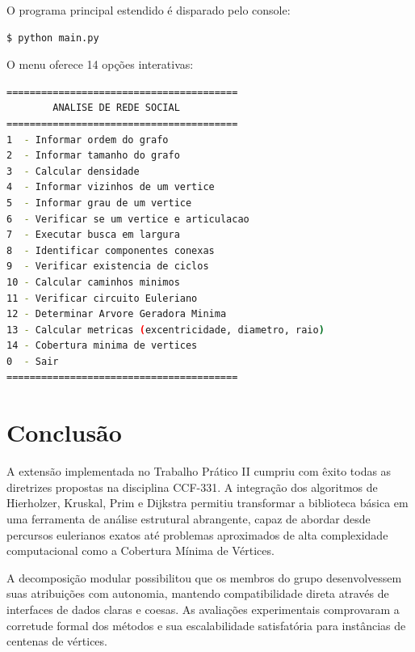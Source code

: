 \documentclass[12pt,a4paper]{article}
\begin{document}
O programa principal estendido é disparado pelo console:
\begin{lstlisting}[language=bash, numbers=none]
$ python main.py
\end{lstlisting}

O menu oferece 14 opções interativas:
\begin{lstlisting}[language=bash, numbers=none]
========================================
        ANALISE DE REDE SOCIAL
========================================
1  - Informar ordem do grafo
2  - Informar tamanho do grafo
3  - Calcular densidade
4  - Informar vizinhos de um vertice
5  - Informar grau de um vertice
6  - Verificar se um vertice e articulacao
7  - Executar busca em largura
8  - Identificar componentes conexas
9  - Verificar existencia de ciclos
10 - Calcular caminhos minimos
11 - Verificar circuito Euleriano
12 - Determinar Arvore Geradora Minima
13 - Calcular metricas (excentricidade, diametro, raio)
14 - Cobertura minima de vertices
0  - Sair
========================================
\end{lstlisting}

\section{Conclusão}

A extensão implementada no Trabalho Prático II cumpriu com êxito todas as diretrizes propostas na disciplina CCF-331. A integração dos algoritmos de Hierholzer, Kruskal, Prim e Dijkstra permitiu transformar a biblioteca básica em uma ferramenta de análise estrutural abrangente, capaz de abordar desde percursos eulerianos exatos até problemas aproximados de alta complexidade computacional como a Cobertura Mínima de Vértices.

A decomposição modular possibilitou que os membros do grupo desenvolvessem suas atribuições com autonomia, mantendo compatibilidade direta através de interfaces de dados claras e coesas. As avaliações experimentais comprovaram a corretude formal dos métodos e sua escalabilidade satisfatória para instâncias de centenas de vértices.
\end{document}
